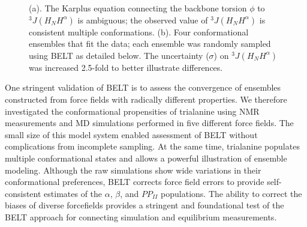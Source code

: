 \documentclass[11pt,titlepage]{article}
\begin{document}
\begin{figure}
\caption{
(a).  The Karplus equation connecting the backbone torsion $\phi$ to $^3J(H_NH^\alpha)$ is ambiguous; the observed value of $^3J(H_NH^\alpha)$ is consistent multiple conformations.  (b).  Four conformational ensembles that fit the data; each ensemble was randomly sampled using BELT as detailed below.  The uncertainty ($\sigma$) on $^3J(H_NH^\alpha)$ was increased 2.5-fold to better illustrate differences.
}
\label{figure:Ambiguity}

\end{figure}


One stringent validation of BELT is to assess the convergence of ensembles constructed from force fields with radically different properties.  We therefore investigated the conformational propensities of trialanine using NMR measurements \citep{Graf2007} and MD simulations performed in five different force fields.  The small size of this model system enabled assessment of BELT without complications from incomplete sampling.  At the same time, trialanine populates multiple conformational states and allows a powerful illustration of ensemble modeling.  Although the raw simulations show wide variations in their conformational preferences, BELT corrects force field errors to provide self-consistent estimates of the $\alpha$, $\beta$, and $PP_{II}$ populations.  The ability to correct the biases of diverse forcefields provides a stringent and foundational test of the BELT approach for connecting simulation and equilibrium measurements. 
\end{document}
